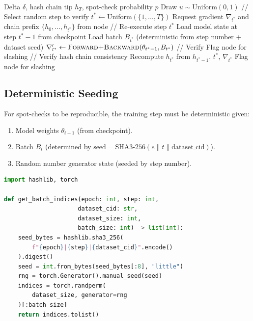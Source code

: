 \documentclass[11pt,letterpaper]{article}
\begin{document}
\begin{algorithm}[t]
\caption{Spot-Verify Protocol}
\label{alg:spotcheck}
\begin{algorithmic}[1]
\REQUIRE Delta $\delta$, hash chain tip $h_T$, spot-check probability $p$
\STATE Draw $u \sim \text{Uniform}(0, 1)$
    \STATE // Select random step to verify
    \STATE $t^* \leftarrow \text{Uniform}(\{1, \ldots, T\})$
    \STATE Request gradient $\nabla_{t^*}$ and chain prefix $\{h_0, \ldots, h_{t^*}\}$ from node
    \STATE // Re-execute step $t^*$
    \STATE Load model state at step $t^* - 1$ from checkpoint
    \STATE Load batch $B_{t^*}$ (deterministic from step number + dataset seed)
    \STATE $\nabla'_{t^*} \leftarrow \textsc{Forward+Backward}(\theta_{t^*-1}, B_{t^*})$
    \STATE // Verify
        \STATE Flag node for slashing
    \ENDIF
    \STATE // Verify hash chain consistency
    \STATE Recompute $h_{t^*}$ from $h_{t^*-1}$, $t^*$, $\nabla_{t^*}$
        \STATE Flag node for slashing
    \ENDIF
\ENDIF
\end{algorithmic}
\end{algorithm}

\subsection{Deterministic Seeding}

For spot-checks to be reproducible, the training step must be deterministic given:
\begin{enumerate}
    \item Model weights $\theta_{t-1}$ (from checkpoint).
    \item Batch $B_t$ (determined by $\text{seed} = \text{SHA3-256}(e \| t \| \text{dataset\_cid})$).
    \item Random number generator state (seeded by step number).
\end{enumerate}

\begin{lstlisting}[language=python,caption=Deterministic batch selection]
import hashlib, torch

def get_batch_indices(epoch: int, step: int,
                     dataset_cid: str,
                     dataset_size: int,
                     batch_size: int) -> list[int]:
    seed_bytes = hashlib.sha3_256(
        f"{epoch}|{step}|{dataset_cid}".encode()
    ).digest()
    seed = int.from_bytes(seed_bytes[:8], "little")
    rng = torch.Generator().manual_seed(seed)
    indices = torch.randperm(
        dataset_size, generator=rng
    )[:batch_size]
    return indices.tolist()
\end{lstlisting}
\end{document}
